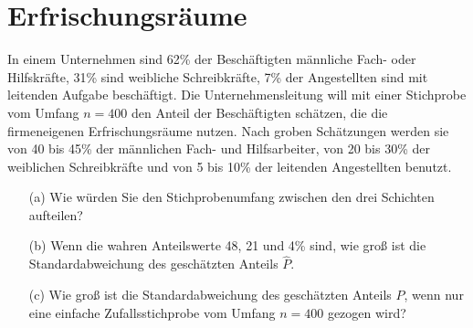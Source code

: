 \documentclass{article}
\begin{document}
\section{Erfrischungsräume}
In einem Unternehmen sind 62\% der Beschäftigten männliche Fach- oder Hilfskräfte,
31\% sind weibliche Schreibkräfte, 7\% der Angestellten sind mit leitenden Aufgabe beschäftigt.
Die Unternehmensleitung will mit einer Stichprobe vom Umfang $n=400$ den Anteil der Beschäftigten schätzen,
die die firmeneigenen Erfrischungsräume nutzen. Nach groben Schätzungen werden sie von
40 bis 45\% der männlichen Fach- und Hilfsarbeiter, von 20 bis 30\% der weiblichen Schreibkräfte und
von 5 bis 10\% der leitenden Angestellten benutzt.
\begin{enumerate}
	\item[(a)] Wie würden Sie den Stichprobenumfang zwischen den drei Schichten aufteilen?
	\item[(b)] Wenn die wahren Anteilswerte 48, 21 und 4\% sind, wie groß ist die Standardabweichung
	des geschätzten Anteils $\hat P$.
	\item[(c)] Wie groß ist die Standardabweichung des geschätzten Anteils $\hat P$, wenn nur eine
	einfache Zufallsstichprobe vom Umfang $n=400$ gezogen wird?
\end{enumerate}
\end{document}
